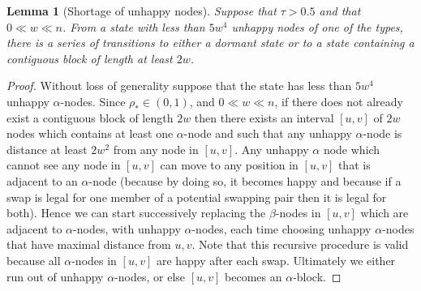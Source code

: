 \documentclass[11pt]{article}
\theoremstyle{plain}
\newtheorem{lem}[thm]{Lemma}
\numberwithin{equation}{subsection}
\begin{document}
\begin{lem}[Shortage of unhappy nodes]\label{le:shortunhapno}
Suppose that $\tau>0.5$ and that $0\ll w \ll n$. From a state with less 
than $5w^4$ unhappy nodes of one of the types, there is a series of transitions
to either a dormant state or to a state containing a contiguous block of length
at least $2w$.
\end{lem}
\begin{proof}
Without loss of
generality suppose that the state has 
less than $5w^4$ unhappy $\alpha$-nodes. Since $\rho_{\ast}\in (0,1)$, and $0\ll w \ll n$, 
if there does not already exist a contiguous block of length $2w$ then 
there exists an interval $[u,v]$ of $2w$ nodes which contains at least one $\alpha$-node 
and such that
any unhappy $\alpha$-node is distance at least
$2w^2$ from any node in
$[u,v]$. 
Any unhappy $\alpha$ node which cannot see any node in  
$[u,v]$ can move to any position in $[u,v]$ that is adjacent to an $\alpha$-node  (because by doing so, it becomes happy and because if a swap is legal for one member of a potential swapping pair then it is legal for both). 
Hence we can start successively replacing the $\beta$-nodes in
$[u,v]$ which are adjacent to $\alpha$-nodes, with unhappy $\alpha$-nodes, each time choosing unhappy $\alpha$-nodes that have maximal distance from $u,v$.
Note that
this recursive procedure is valid because all $\alpha$-nodes in $[u,v]$ are happy after each swap.
Ultimately we either 
run out of unhappy $\alpha$-nodes,
or else $[u,v]$ becomes an $\alpha$-block. 
\end{proof}
\end{document}
